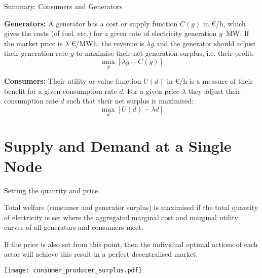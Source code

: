 \documentclass[10pt,aspectratio=169,dvipsnames]{beamer}
\def\l{\lambda}
\begin{document}
\begin{frame}{Summary: Consumers and Generators}

{\bf Generators:}  A generator has a \alert{cost} or \alert{supply function} $C(g)$ in \euro/h, which
  gives the costs (of fuel, etc.) for a given rate of electricity
  generation $g$~MW. If the market price is $\lambda$ \euro/MWh, the revenue is $\l g$ and the generator should adjust their
generation rate $g$ to maximise their \alert{net generation surplus}, i.e. their profit:
  \begin{equation*}
    \max_g \left[ \l g - C(g) \right]
  \end{equation*}


{\bf Consumers:} Their \alert{utility} or \alert{value function} $U(d)$ in \euro/h is a
  measure of their benefit for a given consumption rate $d$. For a given price $\lambda$ they adjust their consumption rate $d$ such that their \alert{net surplus} is maximised:
    \begin{equation*}
    \max_d \left[U(d) - \l d \right]
  \end{equation*}

  \end{frame}

\section{Supply and Demand at a Single Node}


\begin{frame}{Setting the quantity and price}

  \alert{Total welfare} (consumer and generator surplus) is maximised
  if the total quantity of electricity is set where the aggregated marginal cost and
  marginal utility curves of all generators and consumers meet.

  If the price is also set from this point, then the individual
  optimal actions of each actor will achieve this result in a perfect
  decentralised market.

  \centering
  \texttt{[image: consumer\_producer\_surplus.pdf]}




\end{frame}
\end{document}
